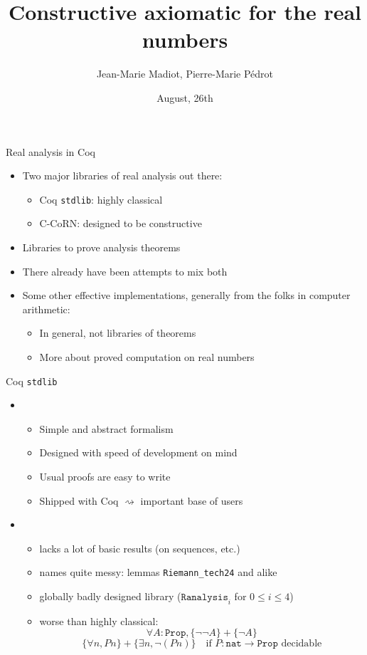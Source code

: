 \documentclass{beamer}
\author{Jean-Marie Madiot, Pierre-Marie Pédrot}
\title{Constructive axiomatic for the real numbers}
\institute{Coqtail Junior Laboratory\\
	ENS Lyon}
\date{August, 26th}
\begin{document}
\begin{frame}[t,plain]
\titlepage
\end{frame}

\begin{frame}{Real analysis in Coq}

\begin{itemize}
  \item Two major libraries of real analysis out there:
  \begin{itemize}
    \item Coq \texttt{stdlib}: highly classical
    \item C-CoRN: designed to be constructive
  \end{itemize}

  \item Libraries to prove analysis theorems
  \item There already have been attempts to mix both
  \pause

  \item Some other effective implementations, generally from the folks in computer arithmetic:
  \begin{itemize}
    \item In general, not libraries of theorems
    \item More about proved computation on real numbers
  \end{itemize}

\end{itemize}

\end{frame}

\begin{frame}{Coq \texttt{stdlib}}

\begin{itemize}
  \item \color{blue}{Pros}
  \begin{itemize}
    \item Simple and abstract formalism
    \item Designed with speed of development on mind
    \item Usual proofs are easy to write
    \item Shipped with Coq $\rightsquigarrow$ important base of users
  \end{itemize}\pause
  \item \color{red}{Cons}
  \begin{itemize}
    \item lacks a lot of basic results (on sequences, etc.)
    \item names quite messy: lemmas \texttt{Riemann\_tech24} and alike
    \item globally badly designed library ($\mathtt{Ranalysis}_i$ for $0 \le i \le 4$)
    \item worse than \alert{highly} classical:
    $$\forall A : \mathtt{Prop}, \{\neg\neg A\} + \{\neg A\}$$
    $$\{\forall n, P n\} + \{\exists n,\neg (P n)\}\quad \text{if $P : \mathtt{nat}\rightarrow\mathtt{Prop}$ decidable}$$
  \end{itemize}

\end{itemize}

\end{frame}
\end{document}
